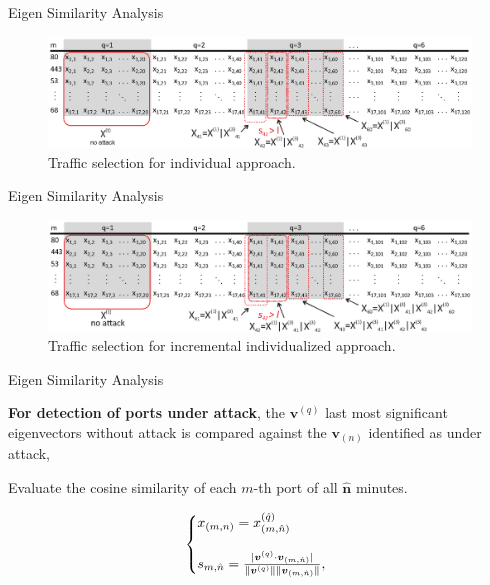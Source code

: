 \documentclass[newPxFont, numfooter, sectionpages]{beamer}
\DeclarePairedDelimiter\abs{\lvert}{\rvert}%
\DeclarePairedDelimiter\norm{\lVert}{\rVert}%
\begin{document}
\begin{frame}{Eigen Similarity Analysis}
	
	\begin{figure}[h!]
	     \includegraphics[width=11.5cm]{../figures/individualized.eps}
	     \caption{Traffic selection for individual approach.}
	     \label{fig:2_fig9}
	\end{figure}
\end{frame}
\begin{frame}{Eigen Similarity Analysis}
	
	\begin{figure}[h!]
	     \includegraphics[width=11.5cm]{../figures/incremental_individualized.eps}
	     \caption{Traffic selection for incremental individualized approach.}
	     \label{fig:2_fig2}
	\end{figure}

\end{frame}
\begin{frame}{Eigen Similarity Analysis}
	
	\textbf{For detection of ports under attack}, the $\boldsymbol{v}^{(q)}$ last most significant eigenvectors without attack is compared against the $\boldsymbol{v}_{(n)}$ identified as under attack, 

	Evaluate the cosine similarity of each $m$-th port of all $\boldsymbol{\hat{n}}$ minutes.

	\begin{equation}\label{eq:eq15}
		\left\{
		\begin{array}{@{}ll@{}}
			x_{(m,n)} = x^{(\hat{q})}_{(m,\hat{n})} \\
			\\
			s_{m,\hat{n}} = \frac{\abs{\boldsymbol{v}^{(q)} \cdot \boldsymbol{v}_{(m,\hat{n})}}}{\norm{\boldsymbol{v}^{(q)}}\norm{\boldsymbol{v}_{(m,\hat{n})}}},
		\end{array}\right.
	\end{equation}

\end{frame}
	
\end{document}
